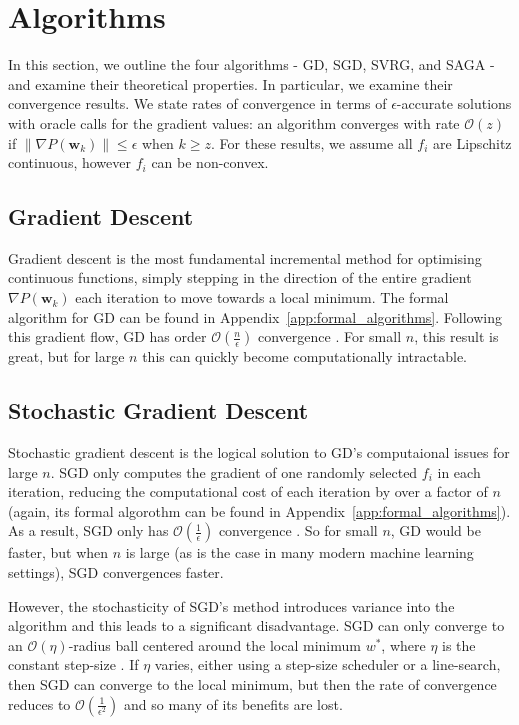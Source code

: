 \section{Algorithms}

In this section, we outline the four algorithms - GD, SGD, SVRG, and SAGA - and examine their theoretical properties. In particular, we examine their convergence results. We state rates of convergence in terms of $\epsilon$-accurate solutions with oracle calls for the gradient values: an algorithm converges with rate $\mathcal{O}\left(z\right)$ if $\left\|\nabla P\left(\mathbf{w}_k\right)\right\| \leq \epsilon$ when $k \geq z$. For these results, we assume all $f_i$ are Lipschitz continuous, however $f_i$ can be non-convex.

\subsection{Gradient Descent}

Gradient descent is the most fundamental incremental method for optimising continuous functions, simply stepping in the direction of the entire gradient $\nabla P\left({\mathbf{w}}_k \right)$ each iteration to move towards a local minimum. The formal algorithm for GD can be found in Appendix~\ref{app:formal_algorithms}. Following this gradient flow, GD has order $\mathcal{O}\left(\frac{n}{\epsilon}\right)$ convergence \cite{reddi2016stochastic}. For small $n$, this result is great, but for large $n$ this can quickly become computationally intractable.

\subsection{Stochastic Gradient Descent}

Stochastic gradient descent is the logical solution to GD's computaional issues for large $n$. SGD only computes the gradient of one randomly selected $f_i$ in each iteration, reducing the computational cost of each iteration by over a factor of $n$ (again, its formal algorothm can be found in Appendix~\ref{app:formal_algorithms}). As a result, SGD only has $\mathcal{O}\left(\frac{1}{\epsilon}\right)$ convergence \cite{bottou2018optimization}. So for small $n$, GD would be faster, but when $n$ is large (as is the case in many modern machine learning settings), SGD convergences faster.

However, the stochasticity of SGD's method introduces variance into the algorithm and this leads to a significant disadvantage. SGD can only converge to an $\mathcal{O}\left(\eta\right)$-radius ball centered around the local minimum $w^*$, where $\eta$ is the constant step-size \cite{bottou2018optimization}. If $\eta$ varies, either using a step-size scheduler or a line-search, then SGD can converge to the local minimum, but then the rate of convergence reduces to $\mathcal{O}\left(\frac{1}{\epsilon^2}\right)$ \cite{reddi2016stochastic} and so many of its benefits are lost.

